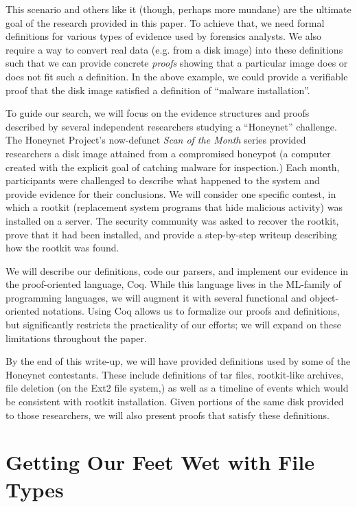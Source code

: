 \documentclass[nocopyrightspace]{sigplanconf}
\begin{document}
This scenario and others like it (though, perhaps more mundane) are the
ultimate goal of the research provided in this paper. To achieve that, we need
formal definitions for various types of evidence used by forensics analysts.
We also require a way to convert real data (e.g. from a disk image) into these
definitions such that we can provide concrete {\em proofs} showing that a
particular image does or does not fit such a definition. In the above example,
we could provide a verifiable proof that the disk image satisfied a definition
of ``malware installation''. 

To guide our search, we will focus on the evidence structures and proofs
described by several independent researchers studying a ``Honeynet''
challenge. The Honeynet Project\cite{honeynet}'s now-defunct {\it Scan of the
Month} series provided researchers a disk image attained from a compromised
honeypot (a computer created with the explicit goal of catching malware for
inspection.) Each month, participants were challenged to describe what
happened to the system and provide evidence for their conclusions. We will
consider one specific contest\cite{honeynet-15}, in which a rootkit
(replacement system programs that hide malicious activity) was installed on a
server. The security community was asked to recover the rootkit, prove that it
had been installed, and provide a step-by-step writeup describing how the
rootkit was found.

We will describe our definitions, code our parsers, and implement our evidence
in the proof-oriented language, Coq. While this language lives in the
ML-family of programming languages, we will augment it with several functional
and object-oriented notations. Using Coq allows us to formalize our proofs and
definitions, but significantly restricts the practicality of our efforts; we
will expand on these limitations throughout the paper.

By the end of this write-up, we will have provided definitions used by some of
the Honeynet contestants. These include definitions of tar files, rootkit-like
archives, file deletion (on the Ext2 file system,) as well as a timeline of
events which would be consistent with rootkit installation.  Given portions of
the same disk provided to those researchers, we will also present proofs that
satisfy these definitions.

\section{Getting Our Feet Wet with File Types}
\end{document}
